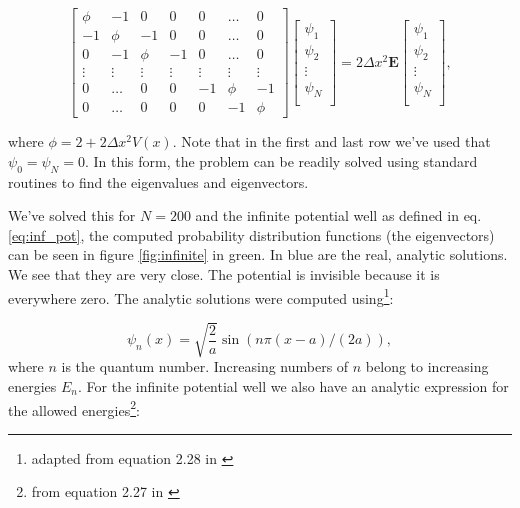 \documentclass[a4paper]{article}
\newcommand{\vect}[1]{\boldsymbol{#1}}
\begin{document}
\begin{equation} \label{eq:schrodinger_eigenvalue}
\left[
\begin{array}{ccccccc}
\phi & -1 & 0 & 0 & 0 & \dots & 0\\
-1 & \phi & -1 & 0 & 0 & \dots & 0\\
0 & -1 & \phi & -1 & 0 & \dots & 0\\
\vdots & \vdots & \vdots & \vdots & \vdots & \vdots & \vdots\\
0 & \dots & 0 & 0 & -1 & \phi & -1\\
0 & \dots & 0 & 0 & 0 & -1 & \phi
\end{array}
\right]
\begin{bmatrix*}
\psi_1 \\
\psi_2 \\
\vdots \\
\psi_N \\
\end{bmatrix*}
=
2\Delta x^2 \vect{E}
\begin{bmatrix*}
\psi_1 \\
\psi_2 \\
\vdots \\
\psi_N \\
\end{bmatrix*},
\end{equation}

where $\phi = 2 + 2 \Delta x ^2 V(x)$. Note that in the first and last row we've used that $\psi_0 = \psi_N = 0$. In this form, the problem can be readily solved using standard routines to find the eigenvalues and eigenvectors.

We've solved this for $N = 200$ and the infinite potential well as defined in eq. \ref{eq:inf_pot}, the computed probability distribution functions (the eigenvectors) can be seen in figure \ref{fig:infinite} in green. In blue are the real, analytic solutions. We see that they are very close. The potential is invisible because it is everywhere zero. The analytic solutions were computed using\footnote{adapted from equation 2.28 in \cite{griffiths}}:

\begin{equation} \label{eq:inf_pot_analytic}
    \psi_n(x) = \sqrt{\frac{2}{a}} \sin(n \pi (x - a) / (2 a)),
\end{equation}
where $n$ is the quantum number. Increasing numbers of $n$ belong to increasing energies $E_n$. For the infinite potential well we also have an analytic expression for the allowed energies\footnote{from equation 2.27 in \cite{griffiths}}:
\end{document}
